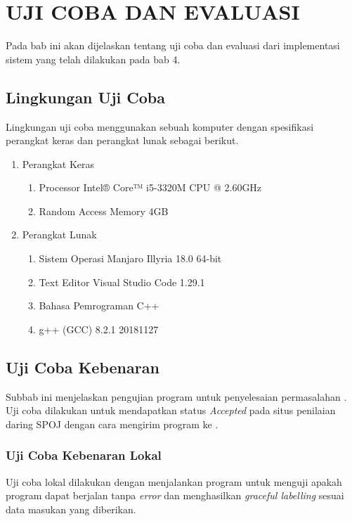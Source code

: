 \chapter{UJI COBA DAN EVALUASI}
Pada bab ini akan dijelaskan tentang uji coba dan evaluasi dari implementasi sistem yang telah dilakukan pada bab 4.

\section{Lingkungan Uji Coba}
Lingkungan uji coba menggunakan sebuah komputer dengan spesifikasi perangkat keras dan perangkat lunak sebagai berikut.

\begin{enumerate}
	\item Perangkat Keras
	\begin{enumerate}
		\item Processor Intel® Core™ i5-3320M CPU @ 2.60GHz
		\item Random Access Memory 4GB
	\end{enumerate}
	\item Perangkat Lunak
	\begin{enumerate}
		\item Sistem Operasi Manjaro Illyria 18.0 64-bit
		\item Text Editor Visual Studio Code 1.29.1
		\item Bahasa Pemrograman C++
		\item g++ (GCC) 8.2.1 20181127
	\end{enumerate}
\end{enumerate}

\section{Uji Coba Kebenaran}
Subbab ini menjelaskan pengujian program untuk penyelesaian permasalahan \problem. Uji coba dilakukan untuk mendapatkan status \textit{Accepted} pada situs penilaian daring SPOJ dengan cara mengirim program ke \problem\cite{PT07G}.

\subsection{Uji Coba Kebenaran Lokal}
Uji coba lokal dilakukan dengan menjalankan program untuk menguji apakah program dapat berjalan tanpa \textit{error} dan menghasilkan \textit{graceful labelling} sesuai data masukan yang diberikan.

